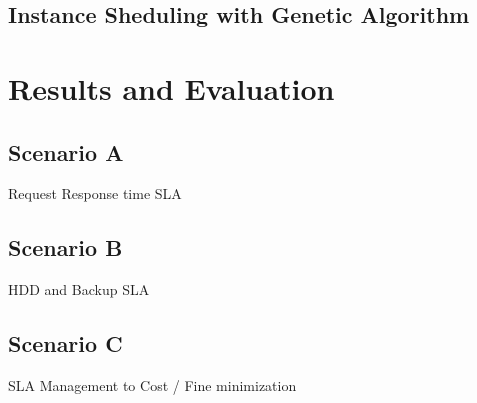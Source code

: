 \subsection{Instance Sheduling with Genetic Algorithm}

\section{Results and Evaluation}

\subsection{Scenario A}
Request Response time SLA


\subsection{Scenario B}
HDD and Backup SLA

\subsection{Scenario C}
SLA Management to Cost / Fine minimization